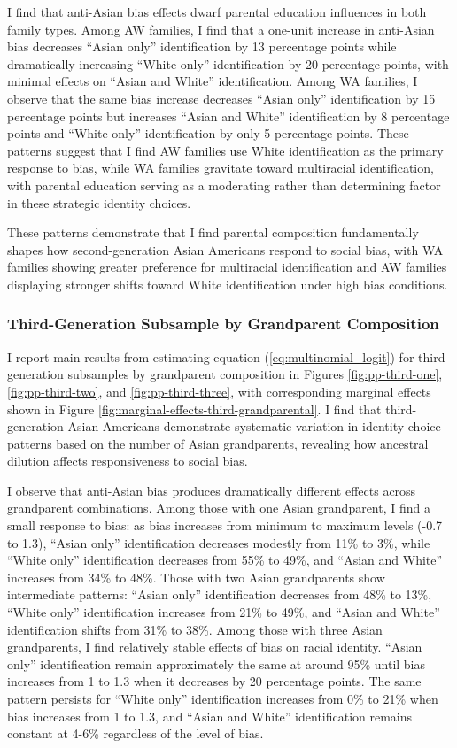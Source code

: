 I find that anti-Asian bias effects dwarf parental education influences in both family types. Among AW families, I find that a one-unit increase in anti-Asian bias decreases ``Asian only'' identification by 13 percentage points while dramatically increasing ``White only'' identification by 20 percentage points, with minimal effects on ``Asian and White'' identification. Among WA families, I observe that the same bias increase decreases ``Asian only'' identification by 15 percentage points but increases ``Asian and White'' identification by 8 percentage points and ``White only'' identification by only 5 percentage points. These patterns suggest that I find AW families use White identification as the primary response to bias, while WA families gravitate toward multiracial identification, with parental education serving as a moderating rather than determining factor in these strategic identity choices.

These patterns demonstrate that I find parental composition fundamentally shapes how second-generation Asian Americans respond to social bias, with WA families showing greater preference for multiracial identification and AW families displaying stronger shifts toward White identification under high bias conditions.

\subsubsection*{Third-Generation Subsample by Grandparent Composition}
I report main results from estimating equation (\ref{eq:multinomial_logit}) for third-generation subsamples by grandparent composition in Figures \ref{fig:pp-third-one}, \ref{fig:pp-third-two}, and \ref{fig:pp-third-three}, with corresponding marginal effects shown in Figure \ref{fig:marginal-effects-third-grandparental}. I find that third-generation Asian Americans demonstrate systematic variation in identity choice patterns based on the number of Asian grandparents, revealing how ancestral dilution affects responsiveness to social bias.

I observe that anti-Asian bias produces dramatically different effects across grandparent combinations. Among those with one Asian grandparent, I find a small response to bias: as bias increases from minimum to maximum levels (-0.7 to 1.3), ``Asian only'' identification decreases modestly from 11\% to 3\%, while ``White only'' identification decreases from 55\% to 49\%, and ``Asian and White'' increases from 34\% to 48\%. Those with two Asian grandparents show intermediate patterns: ``Asian only'' identification decreases from 48\% to 13\%, ``White only'' identification increases from 21\% to 49\%, and ``Asian and White'' identification shifts from 31\% to 38\%. Among those with three Asian grandparents, I find relatively stable effects of bias on racial identity. ``Asian only'' identification remain approximately the same at around 95\% until bias increases from 1 to 1.3 when it decreases by 20 percentage points. The same pattern persists for ``White only'' identification increases from 0\% to 21\% when bias increases from 1 to 1.3, and ``Asian and White'' identification remains constant at 4-6\% regardless of the level of bias.

